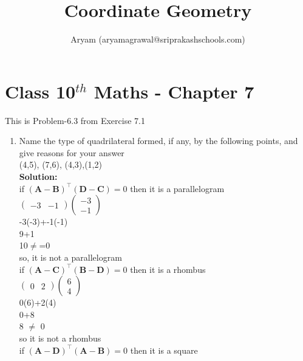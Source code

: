 \documentclass[10pt]{article}
\title{Coordinate Geometry}
\author{Aryam (aryamagrawal@sriprakashschools.com)}
\newcommand{\myvec}[1]{\ensuremath{\begin{pmatrix}#1\end{pmatrix}}}
\newcommand{\solution}{\noindent \textbf{Solution: }}
\providecommand{\brak}[1]{\ensuremath{\left(#1\right)}}
\let\vec\mathbf
\begin{document}
\maketitle

\section*{Class 10$^{th}$ Maths - Chapter 7}

This is Problem-6.3 from Exercise 7.1

\begin{enumerate}

\item Name the type of quadrilateral formed, if any, by the following points, and give reasons for your answer\\

(4,5), (7,6), (4,3),(1,2)\\

\solution\\

if $\brak{\vec{A}-\vec{B}}^{\top}\brak{\vec{D}-\vec{C}}=0$ then it is a parallelogram\\

$\myvec{-3&-1}\myvec{-3\\-1}$\\

-3(-3)+-1(-1)\\

9+1\\

10$\neq$=0\\

so, it is not a parallelogram\\

if $\brak{\vec{A}-\vec{C}}^{\top}\brak{\vec{B}-\vec{D}}=0$ then it is a rhombus\\

$\myvec{0& 2}{\myvec{6\\4}}$\\

0(6)+2(4)\\

0+8\\

8 $\neq$ 0\\

so it is not a rhombus\\

if $\brak{\vec{A}-\vec{D}}^{\top}\brak{\vec{A}-\vec{B}}=0$ then it is a square\\


\end{enumerate}
\end{document}
